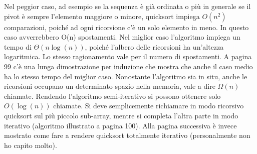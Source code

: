 \documentclass[a4paper]{book}
\begin{document}
Nel peggior caso, ad esempio se la sequenza è già ordinata o più in generale se il pivot è sempre l'elemento maggiore o minore, quicksort impiega $O(n^2)$ comparazioni, poiché ad ogni ricorsione c'è un solo elemento in meno. In questo caso avverrebbero O(n) spostamenti. Nel miglior caso l'algoritmo impiega un tempo di $\Theta (n\log (n))$, poiché l'albero delle ricorsioni ha un'altezza logaritmica. Lo stesso ragionamento vale per il numero di spostamenti. A pagina 99 c'è una lunga dimostrazione per induzione che mostra che anche il caso medio ha lo stesso tempo del miglior caso. Nonostante l'algoritmo sia in situ, anche le ricorsioni occupano un determinato spazio nella memoria, vale a dire $\Omega (n)$ chiamate. Rendendo l'algoritmo semi-iterativo si possono ottenere solo $O(\log (n))$ chiamate. Si deve semplicemente richiamare in modo ricorsivo quicksort sul più piccolo sub-array, mentre si completa l'altra parte in modo iterativo (algoritmo illustrato a pagina 100). Alla pagina successiva è invece mostrato come fare a rendere quicksort totalmente iterativo (personalmente non ho capito molto). 
            
\end{document}
